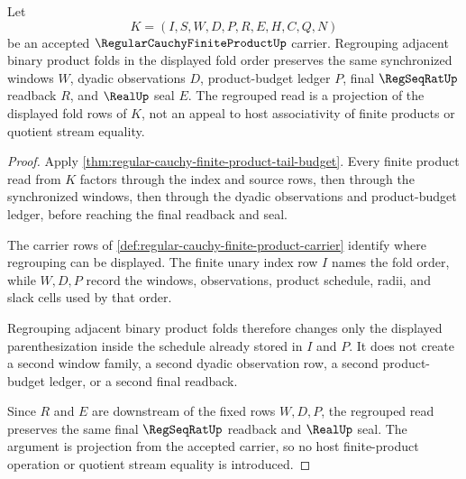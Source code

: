 \begin{theorem}\label{thm:regular-cauchy-finite-product-budget-associativity}
Let
$$
K=(I,S,W,D,P,R,E,H,C,Q,N)
$$
be an accepted $\RegularCauchyFiniteProductUp$ carrier. Regrouping adjacent binary product folds in the displayed fold order preserves the same synchronized windows $W$, dyadic observations $D$, product-budget ledger $P$, final $\RegSeqRatUp$ readback $R$, and $\RealUp$ seal $E$. The regrouped read is a projection of the displayed fold rows of $K$, not an appeal to host associativity of finite products or quotient stream equality.
\end{theorem}
\begin{proof}
Apply \autoref{thm:regular-cauchy-finite-product-tail-budget}. Every finite product read from $K$ factors through the index and source rows, then through the synchronized windows, then through the dyadic observations and product-budget ledger, before reaching the final readback and seal.

The carrier rows of \autoref{def:regular-cauchy-finite-product-carrier} identify where regrouping can be displayed. The finite unary index row $I$ names the fold order, while $W,D,P$ record the windows, observations, product schedule, radii, and slack cells used by that order.

Regrouping adjacent binary product folds therefore changes only the displayed parenthesization inside the schedule already stored in $I$ and $P$. It does not create a second window family, a second dyadic observation row, a second product-budget ledger, or a second final readback.

Since $R$ and $E$ are downstream of the fixed rows $W,D,P$, the regrouped read preserves the same final $\RegSeqRatUp$ readback and $\RealUp$ seal. The argument is projection from the accepted carrier, so no host finite-product operation or quotient stream equality is introduced.
\end{proof}

